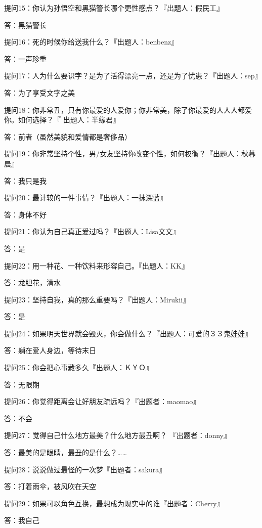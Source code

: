 \documentclass[12pt,a4paper]{article}
\def\blankrev{\vspace{1ex}}									%
\begin{document}
		\blankrev
		提问15：你认为孙悟空和黑猫警长哪个更性感点？『出题人：假民工』\par
		答：黑猫警长

		\blankrev
		提问16：死的时候你给送我什么？『出题人：benbenz』\par
		答：一声珍重

		\blankrev
		提问17：人为什么要识字？是为了活得漂亮一点，还是为了忧患？『出题人：sep』\par
		答：为了享受文字之美

		\blankrev
		提问18：你非常丑，只有你最爱的人爱你；你非常美，除了你最爱的人人人都爱你。如何选择？『
				出题人：半缘君』\par
		答：前者（虽然美貌和爱情都是奢侈品）

		\blankrev
		提问19：你非常坚持个性，男/女友坚持你改变个性，如何权衡？『出题人：秋暮晨』\par
		答：我只是我

		\blankrev
		提问20：最计较的一件事情？『出题人：一抹深蓝』\par
		答：身体不好

		\blankrev
		提问21：你认为自己真正爱过吗？『出题人：Lisa文文』\par
		答：是

		\blankrev
		提问22：用一种花、一种饮料来形容自己。『出题人：KK』\par
		答：龙胆花，清水

		\blankrev
		提问23：坚持自我，真的那么重要吗？『出题人：Mirukii』\par
		答：是

		\blankrev
		提问24：如果明天世界就会毁灭，你会做什么？『出题人：可爱的３３鬼娃娃』\par
		答：躺在爱人身边，等待末日

		\blankrev
		提问25：你会把心事藏多久『出题人：ＫＹＯ』\par
		答：无限期

		\blankrev
		提问26：你觉得距离会让好朋友疏远吗？『出题者：maomao』\par
		答：不会

		\blankrev
		提问27：觉得自己什么地方最美？什么地方最丑啊？ 『出题者：donny』\par
		答：最美的是眼睛，最丑的是什么？……

		\blankrev
		提问28：说说做过最怪的一次梦『出题者：sakura』\par
		答：打着雨伞，被风吹在天空

		\blankrev
		提问29：如果可以角色互换，最想成为现实中的谁『出题者：Cherry』\par
		答：我自己
\end{document}
